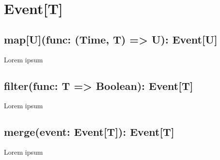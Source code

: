   \section*{Event[T]}
    \subsection*{map[U](func: (Time, T) => U): Event[U]}
      Lorem ipsum
    
    \subsection*{filter(func: T => Boolean): Event[T]}
      Lorem ipsum
      
    \subsection*{merge(event: Event[T]): Event[T]}
      Lorem ipsum
    